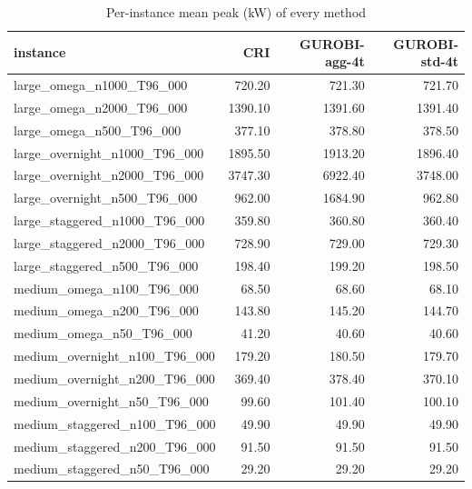\begin{table}[htbp]
\centering
\small
\caption{Per-instance mean peak (kW) of every method}
\label{tab:E7_gurobi_threads_b10_per_instance}
\begin{tabular}{lrrr}
\toprule
instance & CRI & GUROBI-agg-4t & GUROBI-std-4t \\
\midrule
large\_omega\_n1000\_T96\_000 & 720.20 & 721.30 & 721.70 \\
large\_omega\_n2000\_T96\_000 & 1390.10 & 1391.60 & 1391.40 \\
large\_omega\_n500\_T96\_000 & 377.10 & 378.80 & 378.50 \\
large\_overnight\_n1000\_T96\_000 & 1895.50 & 1913.20 & 1896.40 \\
large\_overnight\_n2000\_T96\_000 & 3747.30 & 6922.40 & 3748.00 \\
large\_overnight\_n500\_T96\_000 & 962.00 & 1684.90 & 962.80 \\
large\_staggered\_n1000\_T96\_000 & 359.80 & 360.80 & 360.40 \\
large\_staggered\_n2000\_T96\_000 & 728.90 & 729.00 & 729.30 \\
large\_staggered\_n500\_T96\_000 & 198.40 & 199.20 & 198.50 \\
medium\_omega\_n100\_T96\_000 & 68.50 & 68.60 & 68.10 \\
medium\_omega\_n200\_T96\_000 & 143.80 & 145.20 & 144.70 \\
medium\_omega\_n50\_T96\_000 & 41.20 & 40.60 & 40.60 \\
medium\_overnight\_n100\_T96\_000 & 179.20 & 180.50 & 179.70 \\
medium\_overnight\_n200\_T96\_000 & 369.40 & 378.40 & 370.10 \\
medium\_overnight\_n50\_T96\_000 & 99.60 & 101.40 & 100.10 \\
medium\_staggered\_n100\_T96\_000 & 49.90 & 49.90 & 49.90 \\
medium\_staggered\_n200\_T96\_000 & 91.50 & 91.50 & 91.50 \\
medium\_staggered\_n50\_T96\_000 & 29.20 & 29.20 & 29.20 \\
\bottomrule
\end{tabular}
\end{table}
